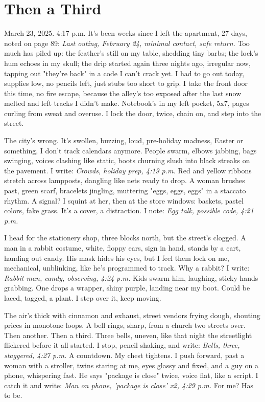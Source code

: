 \documentclass{article}
\begin{document}
\section{Then a Third}

March 23, 2025. 4:17 p.m. It's been weeks since I left the apartment, 27 days, noted on page 89: \textit{Last outing, February 24, minimal contact, safe return.} Too much has piled up: the feather's still on my table, shedding tiny barbs; the lock's hum echoes in my skull; the drip started again three nights ago, irregular now, tapping out "they're back" in a code I can't crack yet. I had to go out today, supplies low, no pencils left, just stubs too short to grip. I take the front door this time, no fire escape, because the alley's too exposed after the last snow melted and left tracks I didn't make. Notebook's in my left pocket, 5x7, pages curling from sweat and overuse. I lock the door, twice, chain on, and step into the street.

The city's wrong. It's swollen, buzzing, loud, pre-holiday madness, Easter or something, I don't track calendars anymore. People swarm, elbows jabbing, bags swinging, voices clashing like static, boots churning slush into black streaks on the pavement. I write: \textit{Crowds, holiday prep, 4:19 p.m.} Red and yellow ribbons stretch across lampposts, dangling like nets ready to drop. A woman brushes past, green scarf, bracelets jingling, muttering "eggs, eggs, eggs" in a staccato rhythm. A signal? I squint at her, then at the store windows: baskets, pastel colors, fake grass. It's a cover, a distraction. I note: \textit{Egg talk, possible code, 4:21 p.m.}

I head for the stationery shop, three blocks north, but the street's clogged. A man in a rabbit costume, white, floppy ears, sign in hand, stands by a cart, handing out candy. His mask hides his eyes, but I feel them lock on me, mechanical, unblinking, like he's programmed to track. Why a rabbit? I write: \textit{Rabbit man, candy, observing, 4:24 p.m.} Kids swarm him, laughing, sticky hands grabbing. One drops a wrapper, shiny purple, landing near my boot. Could be laced, tagged, a plant. I step over it, keep moving.

The air's thick with cinnamon and exhaust, street vendors frying dough, shouting prices in monotone loops. A bell rings, sharp, from a church two streets over. Then another. Then a third. Three bells, uneven, like that night the streetlight flickered before it all started. I stop, pencil shaking, and write: \textit{Bells, three, staggered, 4:27 p.m.} A countdown. My chest tightens. I push forward, past a woman with a stroller, twins staring at me, eyes glassy and fixed, and a guy on a phone, whispering fast. He says "package is close" twice, voice flat, like a script. I catch it and write: \textit{Man on phone, 'package is close' x2, 4:29 p.m.} For me? Has to be.
\end{document}
